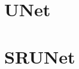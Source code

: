 \label{chap:Architectures}

\section{UNet}
\label{sec:unet}

\section{SRUNet}
\label{sec:srunet}

% 
% 
% 
% 
% 
% 
% 

